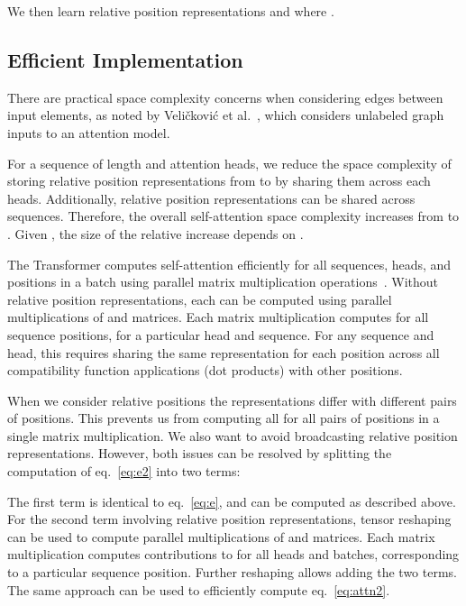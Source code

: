 \documentclass[11pt,a4paper]{article}
\begin{document}
We then learn relative position representations  and
 where .

\subsection{Efficient Implementation}\label{secimpl}

There are practical space complexity concerns when considering
edges between input elements, as noted by Veli{\v{c}}kovi{\'c} et al.~, which considers unlabeled graph inputs to an attention model.

For a sequence of length  and  attention heads, we reduce the space complexity of storing relative position representations from  to  by sharing them across each heads. Additionally, relative position representations can be shared across sequences. Therefore, the overall self-attention space complexity increases from  to . Given , the size of the relative increase depends on .



The Transformer computes self-attention efficiently for all sequences, heads, and positions in a batch using parallel matrix multiplication operations~\cite{vaswani2017}. 
Without relative position representations, each  can be computed using  parallel multiplications of  and  matrices. Each matrix multiplication computes  for all sequence positions, for a particular head and sequence. For any sequence and head, this requires sharing the same representation for each position across all compatibility function applications (dot products) with other positions.

When we consider relative positions the representations differ with different pairs of positions. This prevents us from computing all  for all pairs of positions in a single matrix multiplication. We also want to avoid broadcasting relative position representations. However, both issues can be resolved by splitting the computation of eq.~\eqref{eq:e2} into two terms:




The first term is identical to eq.~\eqref{eq:e}, and can be computed as described above.
For the second term involving relative position representations, tensor reshaping can be used to compute  parallel multiplications of  and  matrices. Each matrix multiplication computes contributions to  for all heads and batches, corresponding to a particular sequence position. Further reshaping allows adding the two terms. The same approach can be used to efficiently compute eq.~\eqref{eq:attn2}.
\end{document}
